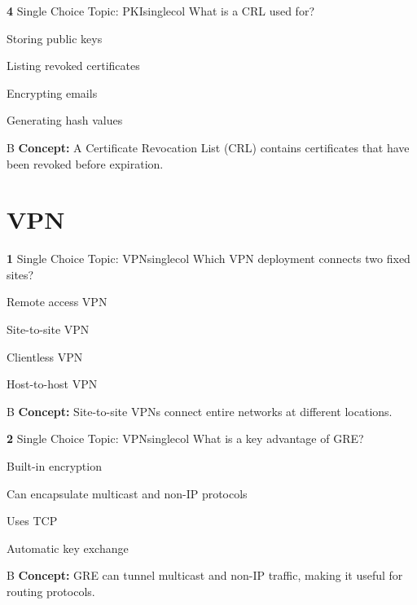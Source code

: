\documentclass[10pt,a4paper]{article}
\begin{document}
\begin{qcard}{\color{white}\textbf{4} \hfill \small Single Choice \textbar{} Topic: PKI}{singlecol}
What is a CRL used for?

\begin{qoptions}
\item Storing public keys
\item Listing revoked certificates
\item Encrypting emails
\item Generating hash values
\end{qoptions}
\begin{explainbox}{B}
\textbf{Concept:} A Certificate Revocation List (CRL) contains certificates that have been revoked before expiration.
\end{explainbox}
\end{qcard}

\section{VPN}
\begin{qcard}{\color{white}\textbf{1} \hfill \small Single Choice \textbar{} Topic: VPN}{singlecol}
Which VPN deployment connects two fixed sites?

\begin{qoptions}
\item Remote access VPN
\item Site-to-site VPN
\item Clientless VPN
\item Host-to-host VPN
\end{qoptions}
\begin{explainbox}{B}
\textbf{Concept:} Site-to-site VPNs connect entire networks at different locations.
\end{explainbox}
\end{qcard}

\begin{qcard}{\color{white}\textbf{2} \hfill \small Single Choice \textbar{} Topic: VPN}{singlecol}
What is a key advantage of GRE?

\begin{qoptions}
\item Built-in encryption
\item Can encapsulate multicast and non-IP protocols
\item Uses TCP
\item Automatic key exchange
\end{qoptions}
\begin{explainbox}{B}
\textbf{Concept:} GRE can tunnel multicast and non-IP traffic, making it useful for routing protocols.
\end{explainbox}
\end{qcard}
\end{document}
